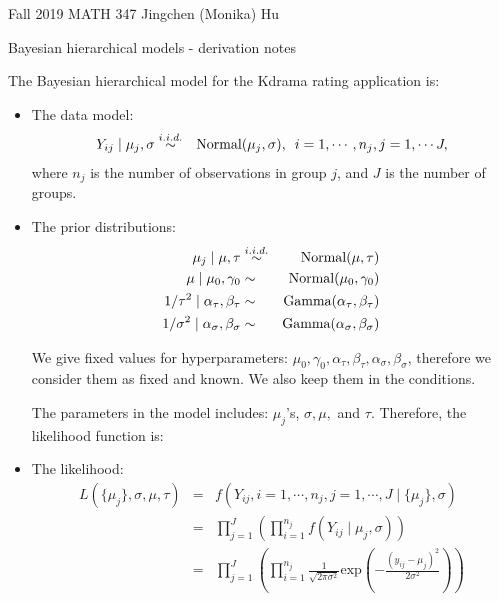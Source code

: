 \documentclass[11pt]{article}
\begin{document}
\enlargethispage{\baselineskip}

Fall 2019 MATH 347 \hfill Jingchen (Monika) Hu\\

\begin{center}
{\huge Bayesian hierarchical models - derivation notes}	\\
\end{center}
\vspace{0.5cm}

The Bayesian hierarchical model for the Kdrama rating application is:

\begin{itemize}
\item The data model:
\begin{eqnarray}
Y_{ij} \mid \mu_j, \sigma &\overset{i.i.d.}{\sim}& {\rm{Normal}}(\mu_j, \sigma), \,\,\, i = 1, \cdots, n_j, j = 1, \cdots J,
\end{eqnarray}
where $n_j$ is the number of observations in group $j$, and $J$ is the number of groups.


\item The prior distributions:
\begin{eqnarray}
\mu_j \mid \mu, \tau &\overset{i.i.d.}{\sim}& {\rm{Normal}}(\mu, \tau) \\
\mu \mid \mu_0, \gamma_0 &\sim& \textrm{Normal}(\mu_0, \gamma_0) \\
1/\tau^2 \mid \alpha_{\tau}, \beta_{\tau} &\sim& \textrm{Gamma}(\alpha_{\tau}, \beta_{\tau}) \\
1/\sigma^2 \mid \alpha_{\sigma}, \beta_{\sigma} &\sim& \textrm{Gamma}(\alpha_{\sigma}, \beta_{\sigma})
\end{eqnarray}

We give fixed values for hyperparameters: $\mu_0, \gamma_0, \alpha_{\tau}, \beta_{\tau}, \alpha_{\sigma}, \beta_{\sigma}$, therefore we consider them as fixed and known. We also keep them in the conditions.

The parameters in the model includes: $\mu_j$'s, $\sigma, \mu,$ and $\tau$. Therefore, the likelihood function is:

\item The likelihood:
\begin{eqnarray}
L(\{\mu_j\}, \sigma, \mu, \tau ) &=& f(Y_{ij}, i = 1, \cdots, n_j, j = 1, \cdots, J \mid \{\mu_j\}, \sigma) \nonumber \\
&=& \prod_{j=1}^{J}\left(\prod_{i=1}^{n_j} f(Y_{ij} \mid \mu_j, \sigma)\right) \nonumber \\
&=& \prod_{j=1}^{J}\left(\prod_{i=1}^{n_j} \frac{1}{\sqrt{2\pi\sigma^2}} \textrm{exp}\left(-\frac{(y_{ij} - \mu_j)^2}{2\sigma^2}\right)\right)
\end{eqnarray}


\end{itemize}
\end{document}

